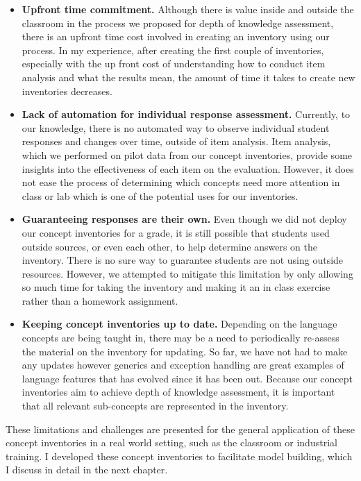 \begin{itemize}
	\item \textbf{Upfront time commitment.} Although there is value inside and outside the classroom in the process we proposed for depth of knowledge assessment, there is an upfront time cost involved in creating an inventory using our process. In my experience, after creating the first couple of inventories, especially with the up front cost of understanding how to conduct item analysis and what the results mean, the amount of time it takes to create new inventories decreases.
	\item \textbf{Lack of automation for individual response assessment.} Currently, to our knowledge, there is no automated way to observe individual student responses and changes over time, outside of item analysis. Item analysis, which we performed on pilot data from our concept inventories, provide some insights into the effectiveness of each item on the evaluation. However, it does not ease the process of determining which concepts need more attention in class or lab which is one of the potential uses for our inventories.
	\item \textbf{Guaranteeing responses are their own.} Even though we did not deploy our concept inventories for a grade, it is still possible that students used outside sources, or even each other, to help determine answers on the inventory. There is no sure way to guarantee students are not using outside resources. However, we attempted to mitigate this limitation by only allowing so much time for taking the inventory and making it an in class exercise rather than a homework assignment.
	\item \textbf{Keeping concept inventories up to date.} Depending on the language concepts are being taught in, there may be a need to periodically re-assess the material on the inventory for updating. So far, we have not had to make any updates however generics and exception handling are great examples of language features that has evolved since it has been out. Because our concept inventories aim to achieve depth of knowledge assessment, it is important that all relevant sub-concepts are represented in the inventory.
\end{itemize}


These limitations and challenges are presented for the general application of these concept inventories in a real world setting, such as the classroom or industrial training. I developed these concept inventories to facilitate model building, which I discuss in detail in the next chapter. 